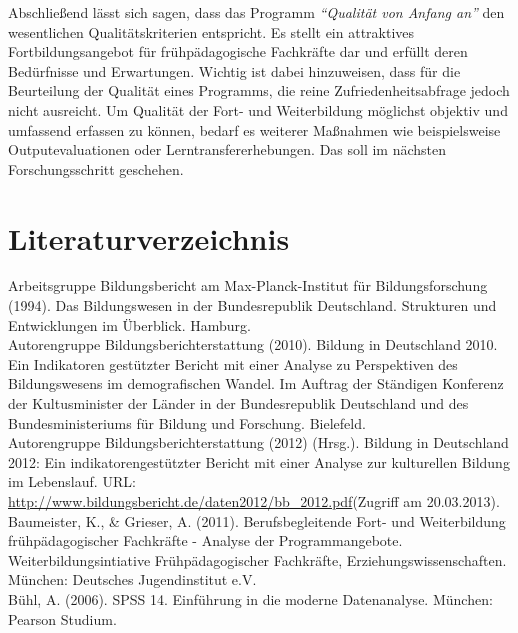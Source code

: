 \documentclass[12pt,a4paper]{article}
\begin{document}
Abschließend lässt sich sagen, dass das Programm \textit{"`Qualität von Anfang an"'} den wesentlichen Qualitätskriterien entspricht. Es stellt ein attraktives Fortbildungsangebot für frühpädagogische Fachkräfte dar und erfüllt deren Bedürfnisse und Erwartungen. 
Wichtig ist dabei hinzuweisen, dass für die Beurteilung der Qualität eines Programms, die reine Zufriedenheitsabfrage jedoch nicht ausreicht. Um Qualität der Fort- und Weiterbildung möglichst objektiv und umfassend erfassen zu können, bedarf es weiterer Maßnahmen wie beispielsweise Outputevaluationen oder Lerntransfererhebungen. Das soll im nächsten Forschungsschritt  geschehen. 



\pagebreak

 

\section*{Literaturverzeichnis}

Arbeitsgruppe Bildungsbericht am Max-Planck-Institut für Bildungsforschung (1994). Das Bildungswesen in der Bundesrepublik Deutschland. Strukturen und Entwicklungen im Überblick. Hamburg.\\

Autorengruppe Bildungsberichterstattung (2010). 
Bildung in Deutschland 2010. Ein Indikatoren gestützter Bericht mit einer Analyse zu Perspektiven des Bildungswesens im demografischen Wandel. Im Auftrag der Ständigen Konferenz der Kultusminister der Länder in der Bundesrepublik Deutschland und des Bundesministeriums für Bildung und Forschung. Bielefeld.\\

Autorengruppe Bildungsberichterstattung (2012) (Hrsg.). Bildung in Deu\-tsch\-land 2012: Ein indikatorengestützter Bericht mit einer Analyse zur kulturellen Bildung im Lebenslauf.
URL: \url{http://www.bildungsbericht.de/daten2012/bb_2012.pdf}(Zugriff am 20.03.2013).\\

Baumeister, K., \& Grieser, A. (2011). Berufsbegleitende Fort- und Weiterbildung frühpädagogischer Fachkräfte - Analyse der Programmangebote. Weiterbildungsintiative Frühpädagogischer Fachkräfte, Erziehungswissenschaften. München: Deutsches Jugendinstitut e.V.\\

Bühl, A. (2006). SPSS 14. Einführung in die moderne Datenanalyse. München: Pearson Studium.\\
\end{document}
